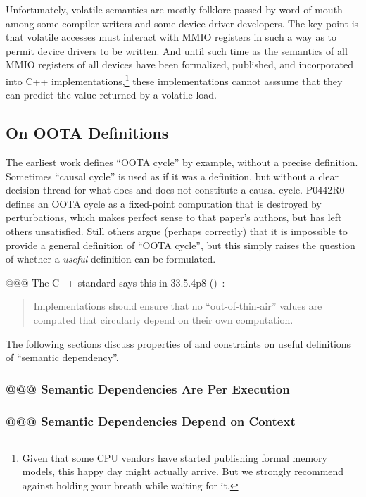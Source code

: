 \documentclass[10]{article}
\begin{document}
Unfortunately, volatile semantics are mostly folklore passed by word
of mouth among some compiler writers and some device-driver developers.
The key point is that volatile accesses must interact with MMIO
registers in such a way as to permit device drivers to be written.
And until such time as the semantics of all MMIO registers of all
devices have been formalized, published, and incorporated into
C++ implementations,\footnote{
	Given that some CPU vendors have started publishing formal
	memory models, this happy day might actually arrive.
	But we strongly recommend against holding your breath while
	waiting for it.}
these implementations cannot asssume that they can predict the value
returned by a volatile load.

\subsection{On OOTA Definitions}
\label{sec:On OOTA Definitions}

The earliest work defines ``OOTA cycle'' by example, without a precise
definition.
Sometimes ``causal cycle'' is used as if it was a definition, but
without a clear decision thread for what does and does not
constitute a causal cycle.
P0442R0 defines an OOTA cycle as a fixed-point computation that is
destroyed by perturbations, which makes perfect sense to that paper's
authors, but has left others unsatisfied.
Still others argue (perhaps correctly) that it is impossible to provide
a general definition of ``OOTA cycle'', but this simply raises
the question of whether a \emph{useful} definition can be formulated.

@@@ The C++ standard says this in 33.5.4p8
()~\cite{ThomasKoeppe2023N4950}:

\begin{quote}
	Implementations should ensure that no “out-of-thin-air” values
	are computed that circularly depend on their own computation.
\end{quote}

The following sections discuss properties of and constraints on
useful definitions of ``semantic dependency''.

\subsubsection{@@@ Semantic Dependencies Are Per Execution}
\label{sec:Semantic Dependencies Are Per Execution}

\subsubsection{@@@ Semantic Dependencies Depend on Context}
\label{sec:Semantic Dependencies Depend on Context}
\end{document}
